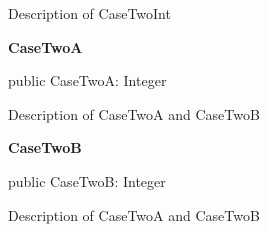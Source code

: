 \documentclass{report}
\newif\ifpdf
\begin{document}
\begin{list}{}
\begin{flushleft}
\ifpdf
\end{flushleft}
\fi


\par Description of CaseTwoInt\label{ok_record_with_case.TMyRecord2-CaseTwoA}
\item[\textbf{CaseTwoA}\hfill]
\ifpdf
\begin{flushleft}
\fi
\begin{ttfamily}
public CaseTwoA: Integer\end{ttfamily}

\ifpdf
\end{flushleft}
\fi


\par Description of CaseTwoA and CaseTwoB\label{ok_record_with_case.TMyRecord2-CaseTwoB}
\item[\textbf{CaseTwoB}\hfill]
\ifpdf
\begin{flushleft}
\fi
\begin{ttfamily}
public CaseTwoB: Integer\end{ttfamily}

\ifpdf
\end{flushleft}
\fi


\par Description of CaseTwoA and CaseTwoB\end{list}
\end{document}
